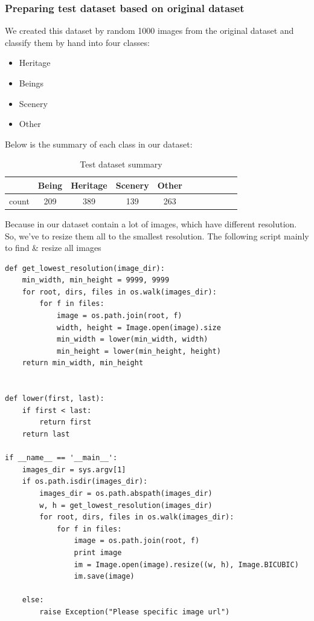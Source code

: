 \documentclass[11pt]{article}
\begin{document}
\subsubsection{Preparing test dataset based on original dataset}
We created this dataset by random 1000 images from the original dataset and classify them by hand into four classes: 
\begin{itemize}
\item Heritage
\item Beings
\item Scenery
\item Other
\end{itemize}
Below is the summary of each class in our dataset:

\begin{table}[H]
\begin{center}
\begin{tabular}{| c | c | c | c | c | c | c | c | c | c | c |}
\hline
 & Being & Heritage & Scenery & Other\\
\hline
count & 209 & 389 & 139 & 263\\
\hline
\end{tabular}
\caption {Test dataset summary}
\end{center}
\end{table}
Because in our dataset contain a lot of images, which have different resolution. So, we've to resize them all to the smallest resolution. The following script mainly to find \& resize all images 
\begin{lstlisting}
def get_lowest_resolution(image_dir):
    min_width, min_height = 9999, 9999
    for root, dirs, files in os.walk(images_dir):
        for f in files:
            image = os.path.join(root, f)
            width, height = Image.open(image).size
            min_width = lower(min_width, width)
            min_height = lower(min_height, height)
    return min_width, min_height


def lower(first, last):
    if first < last:
        return first
    return last

if __name__ == '__main__':
    images_dir = sys.argv[1]
    if os.path.isdir(images_dir):
        images_dir = os.path.abspath(images_dir)
        w, h = get_lowest_resolution(images_dir)
        for root, dirs, files in os.walk(images_dir):
            for f in files:
                image = os.path.join(root, f)
                print image
                im = Image.open(image).resize((w, h), Image.BICUBIC)
                im.save(image)

    else:
        raise Exception("Please specific image url")
\end{lstlisting}
\end{document}
